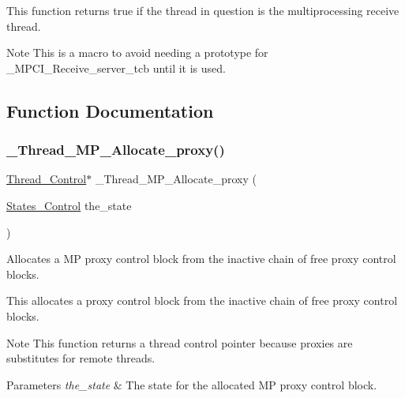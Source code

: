This function returns true if the thread in question is the multiprocessing receive thread.

\begin{DoxyNote}{Note}
This is a macro to avoid needing a prototype for \+\_\+\+M\+P\+C\+I\+\_\+\+Receive\+\_\+server\+\_\+tcb until it is used. 
\end{DoxyNote}


\subsection{Function Documentation}
\mbox{\label{group__RTEMSScoreThreadMP_gaa0f7e564ad228364fb5bf36163bdaefe}} 
\subsubsection{\texorpdfstring{\_Thread\_MP\_Allocate\_proxy()}{\_Thread\_MP\_Allocate\_proxy()}}
{\footnotesize\ttfamily \mbox{\hyperlink{struct__Thread__Control}{Thread\+\_\+\+Control}}$\ast$ \+\_\+\+Thread\+\_\+\+M\+P\+\_\+\+Allocate\+\_\+proxy (\begin{DoxyParamCaption}\item[{\mbox{\hyperlink{group__RTEMSScoreStates_gaeebbea0bfca162709b124fd519cf99d3}{States\+\_\+\+Control}}}]{the\+\_\+state }\end{DoxyParamCaption})}



Allocates a MP proxy control block from the inactive chain of free proxy control blocks. 

This allocates a proxy control block from the inactive chain of free proxy control blocks.

\begin{DoxyNote}{Note}
This function returns a thread control pointer because proxies are substitutes for remote threads.
\end{DoxyNote}

\begin{DoxyItemize}
\item 
\begin{DoxyParams}{Parameters}
{\em the\+\_\+state} & The state for the allocated MP proxy control block. \\
\hline
\end{DoxyParams}

\end{DoxyItemize}\mbox{\label{group__RTEMSScoreThreadMP_ga6dbcb30a4cb121951088a85af42227e2}} 
